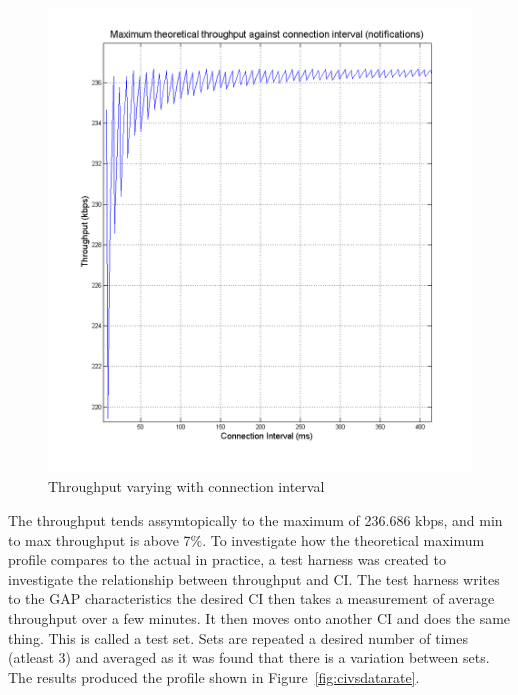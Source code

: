 \documentclass[]{article}
\begin{document}
\begin{figure}[H]
	\begin{center}
		\includegraphics[width = \textwidth]{throughput}
	\end{center}
	\caption{Throughput varying with connection interval}
	\label{fig:throughput}
\end{figure}

The throughput tends assymtopically to the maximum of 236.686 kbps, and min to max throughput is above 7$\%$. To investigate how the theoretical maximum profile compares to the actual in practice, a test harness was created to investigate the relationship between throughput and \ac{CI}. The test harness writes to the \ac{GAP} characteristics the desired \ac{CI} then takes a measurement of average throughput over a few minutes. It then moves onto another \ac{CI} and does the same thing. This is called a test set. Sets are repeated a desired number of times (atleast 3) and averaged as it was found that there is a variation between sets. The results produced the profile shown in Figure~\ref{fig:civsdatarate}.
\end{document}
